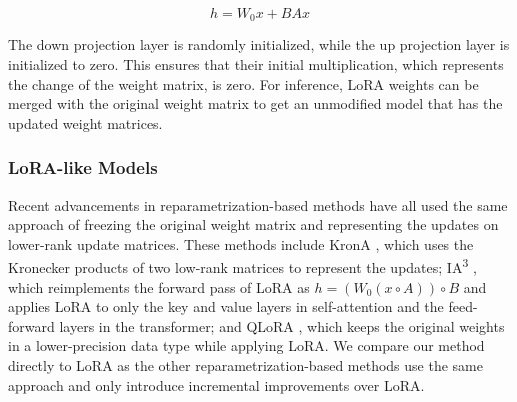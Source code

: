 \begin{equation}
    h = W_0 x + B A x
\end{equation}

The down projection layer is randomly initialized, while the up projection layer is initialized to zero. This ensures that their initial multiplication, which represents the change of the weight matrix, is zero. For inference, LoRA weights can be merged with the original weight matrix to get an unmodified model that has the updated weight matrices.

\subsubsection{LoRA-like Models}
Recent advancements in reparametrization-based methods have all used the same approach of freezing the original weight matrix and representing the updates on lower-rank update matrices. These methods include KronA \cite{edalati2022krona}, which uses the Kronecker products of two low-rank matrices to represent the updates; IA\textsuperscript{3} \cite{ia3}, which reimplements the forward pass of LoRA as \(h = (W_0 (x \circ A)) \circ B\) and applies LoRA to only the key and value layers in self-attention and the feed-forward layers in the transformer; and QLoRA \cite{dettmers2023qlora}, which keeps the original weights in a lower-precision data type while applying LoRA. We compare our method directly to LoRA as the other reparametrization-based methods use the same approach and only introduce incremental improvements over LoRA.